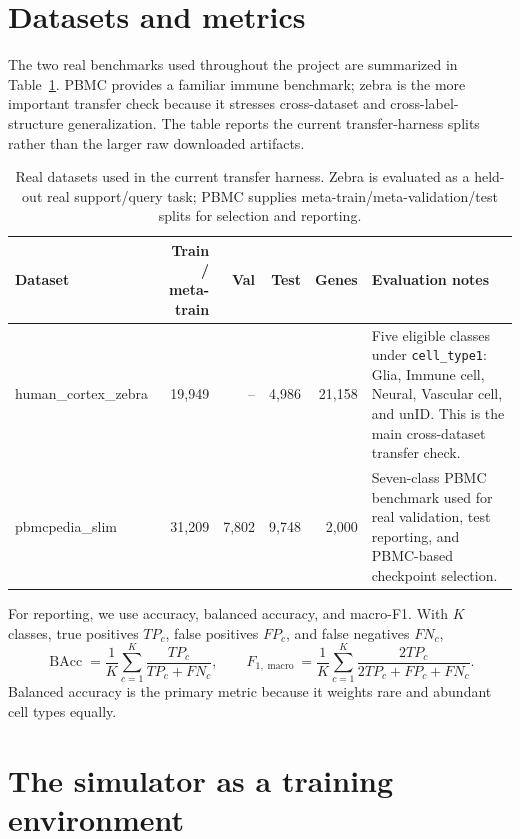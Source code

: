 \documentclass{article}
\newcommand{\BAcc}{\operatorname{BAcc}}
\newcommand{\Fmacro}{F_{1,\operatorname{macro}}}
\begin{document}
\section{Datasets and metrics}

The two real benchmarks used throughout the project are summarized in Table~\ref{tab:datasets}. PBMC provides a familiar immune benchmark; zebra is the more important transfer check because it stresses cross-dataset and cross-label-structure generalization. The table reports the current transfer-harness splits rather than the larger raw downloaded artifacts.

\begin{table}[t]
\centering
\small
\caption{Real datasets used in the current transfer harness. Zebra is evaluated as a held-out real support/query task; PBMC supplies meta-train/meta-validation/test splits for selection and reporting.}
\label{tab:datasets}
\begin{tabularx}{\textwidth}{@{}lrrrrX@{}}
\toprule
\textbf{Dataset} & \textbf{Train / meta-train} & \textbf{Val} & \textbf{Test} & \textbf{Genes} & \textbf{Evaluation notes} \\
\midrule
human\_cortex\_zebra & 19{,}949 & -- & 4{,}986 & 21{,}158 & Five eligible classes under \texttt{cell\_type1}: Glia, Immune cell, Neural, Vascular cell, and unID. This is the main cross-dataset transfer check. \\
pbmcpedia\_slim & 31{,}209 & 7{,}802 & 9{,}748 & 2{,}000 & Seven-class PBMC benchmark used for real validation, test reporting, and PBMC-based checkpoint selection. \\
\bottomrule
\end{tabularx}
\end{table}

For reporting, we use accuracy, balanced accuracy, and macro-F1. With \(K\) classes, true positives \(TP_c\), false positives \(FP_c\), and false negatives \(FN_c\),
\begin{equation}
    \BAcc=\frac{1}{K}\sum_{c=1}^{K}\frac{TP_c}{TP_c+FN_c},
    \qquad
    \Fmacro=\frac{1}{K}\sum_{c=1}^{K}\frac{2TP_c}{2TP_c+FP_c+FN_c}.
\end{equation}
Balanced accuracy is the primary metric because it weights rare and abundant cell types equally.

\section{The simulator as a training environment}
\end{document}
